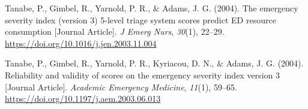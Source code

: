 \documentclass[
]{article}
\newlength{\cslhangindent}
\newlength{\cslentryspacingunit} %
\newenvironment{CSLReferences}[2] %
 {%
  \setlength{\parindent}{0pt}
  \ifodd #1
  \let\oldpar\par
  \def\par{\hangindent=\cslhangindent\oldpar}
  \fi
  \setlength{\parskip}{#2\cslentryspacingunit}
 }%
 {}
\begin{document}
\begin{CSLReferences}{1}{0}
\leavevmode{}%
Tanabe, P., Gimbel, R., Yarnold, P. R., \& Adams, J. G. (2004). The
emergency severity index (version 3) 5-level triage system scores
predict ED resource consumption {[}Journal Article{]}. \emph{J Emerg
Nurs}, \emph{30}(1), 22--29.
\url{https://doi.org/10.1016/j.jen.2003.11.004}

\leavevmode{}%
Tanabe, P., Gimbel, R., Yarnold, P. R., Kyriacou, D. N., \& Adams, J. G.
(2004). Reliability and validity of scores on the emergency severity
index version 3 {[}Journal Article{]}. \emph{Academic Emergency
Medicine}, \emph{11}(1), 59--65.
\url{https://doi.org/10.1197/j.aem.2003.06.013}

\end{CSLReferences}
\end{document}
